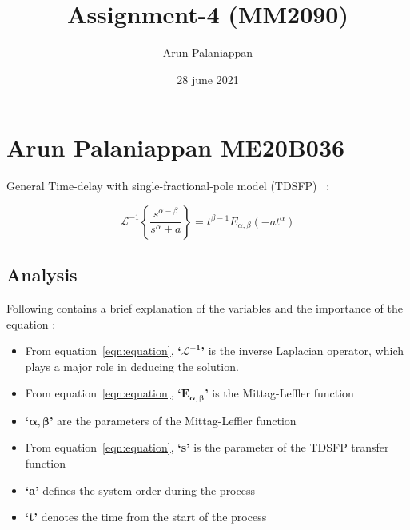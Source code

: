 \documentclass[a4paper, 12pt]{article}
\begin{document}
\title{Assignment-4 (MM2090)}
\author{Arun Palaniappan}
\date{28 june 2021}
\maketitle

\section{Arun Palaniappan ME20B036}

General Time-delay with single-fractional-pole model (TDSFP)~\cite{YUAN2022108111} :

\begin{equation}
 \mathcal{L}^{-1}\left \{\frac{s^{\alpha-\beta}}{s^{\alpha} + a} \right\} = t^{\beta-1}E_{\alpha,\beta}(-at^{\alpha})
 \label{eqn:equation}
\end{equation}

\subsection{Analysis}
Following contains a brief explanation of the variables and the importance of the equation :
\begin{itemize}

    \item From equation~\ref{eqn:equation}, \textbf{`$\bm{\mathcal{L}^{-1}}$'} is the inverse Laplacian operator, which plays a major role in deducing the solution.
    \item From equation~\ref{eqn:equation}, \textbf{`$\bm{E_{\alpha,\beta}}$'} is the Mittag-Leffler function
    \item \textbf{`$\bm{\alpha,\beta}$'} are the parameters of the Mittag-Leffler function
    \item From equation~\ref{eqn:equation}, \textbf{`s'} is the parameter of the TDSFP transfer function
    \item \textbf{`a'} defines the system order during the process
    \item \textbf{`t'} denotes the time from the start of the process
\end{itemize}
\end{document}
